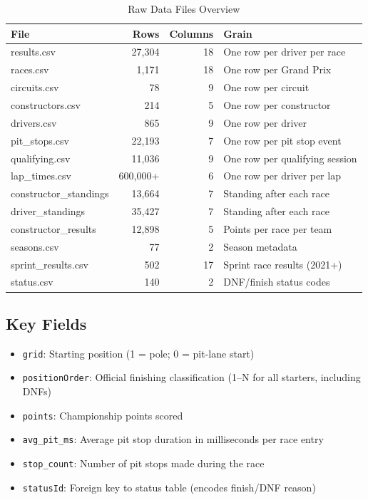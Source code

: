\documentclass[12pt, a4paper]{article}
\begin{document}
\begin{table}[H]
\centering
\caption{Raw Data Files Overview}
\label{tab:raw_data}
\begin{tabular}{l r r l}
\toprule
\textbf{File} & \textbf{Rows} & \textbf{Columns} & \textbf{Grain} \\
\midrule
results.csv             & 27,304  & 18 & One row per driver per race \\
races.csv               & 1,171   & 18 & One row per Grand Prix \\
circuits.csv            & 78      & 9  & One row per circuit \\
constructors.csv        & 214     & 5  & One row per constructor \\
drivers.csv             & 865     & 9  & One row per driver \\
pit\_stops.csv          & 22,193  & 7  & One row per pit stop event \\
qualifying.csv          & 11,036  & 9  & One row per qualifying session \\
lap\_times.csv          & 600,000+& 6  & One row per driver per lap \\
constructor\_standings   & 13,664  & 7  & Standing after each race \\
driver\_standings        & 35,427  & 7  & Standing after each race \\
constructor\_results     & 12,898  & 5  & Points per race per team \\
seasons.csv             & 77      & 2  & Season metadata \\
sprint\_results.csv     & 502     & 17 & Sprint race results (2021+) \\
status.csv              & 140     & 2  & DNF/finish status codes \\
\bottomrule
\end{tabular}
\end{table}

\subsection{Key Fields}
\begin{itemize}[noitemsep]
    \item \texttt{grid}: Starting position (1 = pole; 0 = pit-lane start)
    \item \texttt{positionOrder}: Official finishing classification (1--N for all starters, including DNFs)
    \item \texttt{points}: Championship points scored
    \item \texttt{avg\_pit\_ms}: Average pit stop duration in milliseconds per race entry
    \item \texttt{stop\_count}: Number of pit stops made during the race
    \item \texttt{statusId}: Foreign key to status table (encodes finish/DNF reason)
\end{itemize}
\end{document}
